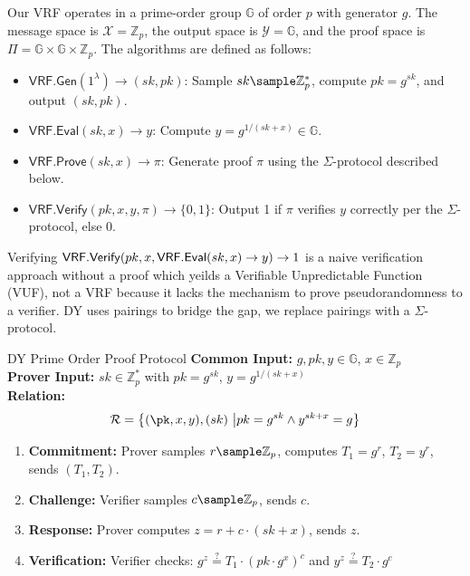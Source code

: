 Our VRF operates in a prime-order group $\mathbb{G}$ of order $p$ with generator $g$. The message space is $\mathcal{X} = \mathbb{Z}_p$, the output space is $\mathcal{Y} = \mathbb{G}$, and the proof space is $\Pi = \mathbb{G} \times \mathbb{G} \times \mathbb{Z}_p$. The algorithms are defined as follows:

\begin{itemize}
    \item $\mathsf{VRF.Gen}(1^\lambda) \to (sk, pk)$: Sample $sk \sample \mathbb{Z}_p^*$, compute $pk = g^{sk}$, and output $(sk, pk)$.
    \item $\mathsf{VRF.Eval}(sk, x) \to y$: Compute $y = g^{1/(sk + x)} \in \mathbb{G}$.
    \item $\mathsf{VRF.Prove}(sk, x) \to \pi$: Generate proof $\pi$ using the $\Sigma$-protocol described below.
    \item $\mathsf{VRF.Verify}(pk, x, y, \pi) \to \{0, 1\}$: Output 1 if $\pi$ verifies $y$ correctly per the $\Sigma$-protocol, else 0.
\end{itemize}

\begin{remark}
    Verifying $\mathsf{VRF.Verify}(pk, x, \mathsf{VRF.Eval}(sk, x) \to y) \to 1$ is a naive verification approach without a proof which yeilds a Verifiable Unpredictable Function (VUF), not a VRF because it lacks the mechanism to prove pseudorandomness to a verifier. DY uses pairings to bridge the gap, we replace pairings with a $\Sigma$-protocol. 
\end{remark}

\begin{protocol}{DY Prime Order Proof Protocol}{}\label{protocol-pdy-protocol1}
\textbf{Common Input:} $g, pk, y \in \mathbb{G}$, $x \in \mathbb{Z}_p$ \\
\textbf{Prover Input:} $sk \in \mathbb{Z}_p^*$ with $pk = g^{sk}$, $y = g^{1/(sk + x)}$ \\
\textbf{Relation: }
\[
\mathcal{R} = \left\{ (\pk, x, y), (sk) \ \middle| pk = g^{sk} \land y^{sk + x} = g \right\}
\]
\begin{enumerate}
    \item \textbf{Commitment:} Prover samples $r \sample  \mathbb{Z}_p$, computes $T_1 = g^r$, $T_2 = y^r$, sends $(T_1, T_2)$.
    \item \textbf{Challenge:} Verifier samples $c \sample  \mathbb{Z}_p$, sends $c$.
    \item \textbf{Response:} Prover computes $z = r + c \cdot (sk + x)$, sends $z$.
    \item \textbf{Verification:} Verifier checks: $g^z \stackrel{?}{=} T_1 \cdot (pk \cdot g^x)^c$ and $y^z \stackrel{?}{=} T_2 \cdot g^c$
\end{enumerate}
\end{protocol}

